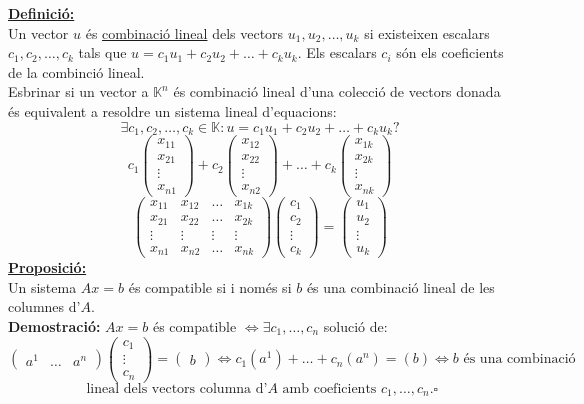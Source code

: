 \documentclass[11pt]{article}
\newcommand{\fieldk}{\mathbb{K}}
\newcommand{\definicio}{\underline{\textbf{Definició:}} \\}
\newcommand{\proposicio}{\underline{\textbf{Proposició:}} \\}
\newcommand{\demostracio}{\textbf{Demostració:} }
\begin{document}
\noindent \definicio Un vector $u$ és \underline{combinació lineal} dels vectors $u_1,u_2,\ldots,u_k$ si existeixen escalars $c_1,c_2,\ldots,c_k$ tals que $u=c_1u_1+c_2u_2+\ldots+c_ku_k$. Els escalars $c_i$ són els coeficients de la combinció lineal.\\
Esbrinar si un vector a $\fieldk^n$ és combinació lineal d'una colecció de vectors donada és equivalent a resoldre un sistema lineal d'equacions:
$$\exists c_1,c_2,\ldots,c_k\in\fieldk : u=c_1u_1+c_2u_2+\ldots+c_ku_k?$$
$$
c_1\left( \begin{array}{c}
x_{11} \\
x_{21} \\
\vdots \\
x_{n1} \end{array} \right)
+ c_2\left( \begin{array}{c}
x_{12} \\
x_{22} \\
\vdots \\
x_{n2} \end{array} \right)
+\ldots
+c_k \left( \begin{array}{c}
x_{1k} \\
x_{2k} \\
\vdots \\
x_{nk} \end{array} \right)
$$
$$
\left( \begin{array}{cccc}
x_{11} & x_{12} & \ldots & x_{1k} \\
x_{21} & x_{22} & \ldots & x_{2k} \\
\vdots & \vdots & \vdots & \vdots\\
x_{n1} & x_{n2} & \ldots & x_{nk} \end{array} \right)
\left( \begin{array}{c}
c_1 \\
c_2 \\
\vdots \\
c_k \end{array} \right)
=
\left( \begin{array}{c}
u_1 \\
u_2 \\
\vdots \\
u_k \end{array} \right)
$$
\proposicio Un sistema $Ax=b$ és compatible si i només si $b$ és una combinació lineal de les columnes d'$A$.\\
\demostracio $Ax=b$ és compatible $\iff\exists c_1,\ldots,c_n$ solució de:
$$
\left( \begin{array}{ccc}
a^1 & \ldots & a^n \end{array} \right)
\left( \begin{array}{c}
c_1 \\
\vdots \\
c_n \end{array} \right)
=
\left( \begin{array}{c}
b \end{array} \right)
\iff c_1(a^1)+\ldots+c_n(a^n)=(b)
\iff b \textrm{ és una combinació}
$$
$$\textrm{ lineal dels vectors columna d'}A\textrm{ amb coeficients }c_1,\ldots,c_n.\square$$
\end{document}
